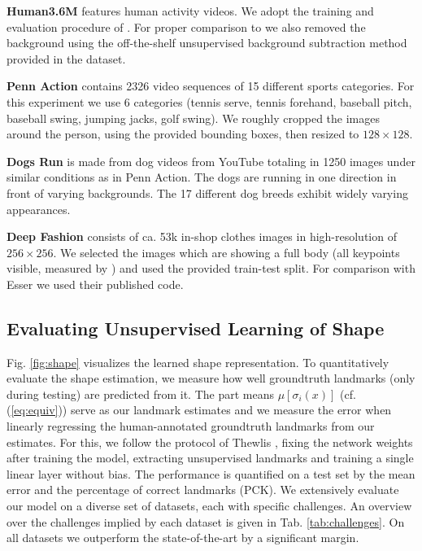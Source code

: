 	\textbf{Human3.6M} \cite{Ionescu:2014ua} features human activity videos.
	We adopt the training and evaluation procedure of \cite{Zhang:2018vz}.
	For proper comparison to \cite{Zhang:2018vz} we also removed the background using the off-the-shelf unsupervised background subtraction method provided in the dataset.


	\textbf{Penn Action} \cite{Zhang:2013tr} contains 2326 video sequences of 15 different sports categories.
	For this experiment we use 6 categories (tennis serve, tennis forehand, baseball pitch, baseball swing, jumping jacks, golf swing).
	We roughly cropped the images around the person, using the provided bounding boxes, then resized to $128\times128$.


	\textbf{Dogs Run} is made from dog videos from YouTube totaling in 1250 images under similar conditions as in Penn Action. The dogs are running in one direction in front of varying backgrounds. The 17 different dog breeds exhibit widely varying appearances.


	\textbf{Deep Fashion} \cite{Liu:2016vv} consists of ca. 53k in-shop clothes images in high-resolution of $256 \times 256$. We selected the images which are showing a full body (all keypoints visible, measured by \cite{Cao:2017vv}) and used the provided train-test split.
	For comparison with Esser \etal \cite{Esser:2018ue} we used their published code.

	\subsection{Evaluating Unsupervised Learning of Shape}\label{sec:shape}
	
	Fig. \ref{fig:shape} visualizes the learned shape representation.
	To quantitatively evaluate the shape estimation, we measure how well groundtruth landmarks (only during testing) are predicted from it.
	The part means $\mu[\sigma_i(x)]$ (cf. (\ref{eq:equiv})) serve as our landmark estimates and we measure the error when linearly regressing the human-annotated groundtruth landmarks from our estimates.
	For this, we follow the protocol of Thewlis \etal \cite{Thewlis:2017wi}, fixing the network weights after training the model, extracting unsupervised landmarks and training a single linear layer without bias.
	The performance is quantified on a test set by the mean error and the percentage of correct landmarks (PCK).
	We extensively evaluate our model on a diverse set of datasets, each with specific challenges. An overview over the challenges implied by each dataset is given in Tab. \ref{tab:challenges}.
	On all datasets we outperform the state-of-the-art by a significant margin.


